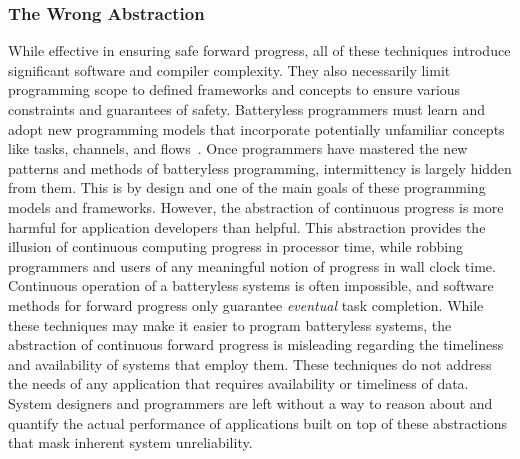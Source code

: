 \subsubsection{The Wrong Abstraction}
While effective in ensuring safe forward progress, all of these techniques introduce
significant software and compiler complexity.
They also necessarily limit programming scope to defined frameworks and concepts to ensure various constraints and guarantees of safety.
Batteryless programmers must learn and adopt new programming models that incorporate potentially unfamiliar concepts like tasks, channels, and flows~\cite{colin2016chain,maeng2017alpaca,hesterTimely17}.
Once programmers have mastered the new patterns and methods of batteryless programming, intermittency is largely hidden from them.
This is by design and one of the main goals of these programming models and frameworks.
However, the abstraction of continuous progress is more harmful for application developers than helpful.
This abstraction provides the illusion of continuous computing progress in processor time, while robbing programmers and users of any meaningful notion of progress in wall clock time.
Continuous operation of a batteryless systems is often impossible, and software methods for forward progress only guarantee \textit{eventual} task completion.
While these techniques may make it easier to program batteryless systems,
the abstraction of continuous forward progress is misleading regarding the timeliness and availability 
of systems that employ them.
These techniques do not address the needs of any application that requires availability or timeliness of data. 
System designers and programmers are left without a way to reason about and quantify the actual performance of applications built on top of these abstractions that mask inherent system unreliability. 


